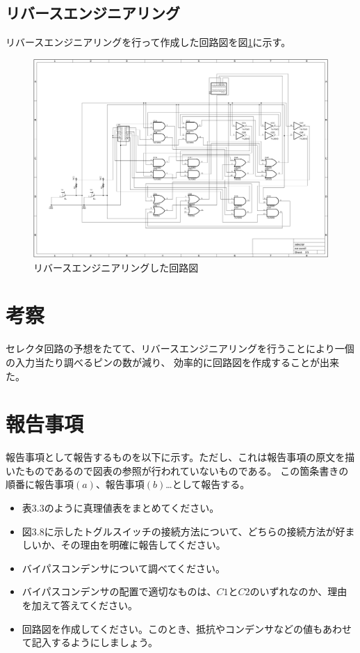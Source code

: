 \documentclass[a4paper,11pt]{ltjsarticle}
\begin{document}
\begin{table}[h]
\begin{tabular}{|c|c|c|c|c|}
\begin{minipage}{0.15\columnwidth}
    \end{minipage} \\
    \hline
  \end{tabular} 
  \label{tab:selector}
\end{table}
\subsection{リバースエンジニアリング}
リバースエンジニアリングを行って作成した回路図を図\ref{fig:reverse}に示す。
\begin{figure}
  \centering
  \includegraphics[angle = 90 , width =0.9\columnwidth]{./image/circuit.png}
  \caption{リバースエンジニアリングした回路図}
  \label{fig:reverse}
\end{figure}
\newpage
\section{考察}
セレクタ回路の予想をたてて、リバースエンジニアリングを行うことにより一個の入力当たり調べるピンの数が減り、
効率的に回路図を作成することが出来た。
\section{報告事項}
報告事項として報告するものを以下に示す。ただし、これは報告事項の原文を描いたものであるので図表の参照が行われていないものである。
この箇条書きの順番に報告事項$(a)$、報告事項$(b)$\dots として報告する。
\begin{itemize}
  \item 表$3.3$のように真理値表をまとめてください。
  \item 図$3.8$に示したトグルスイッチの接続方法について、どちらの接続方法が好ましいか、その理由を明確に報告してください。
  \item バイパスコンデンサについて調べてください。
  \item バイパスコンデンサの配置で適切なものは、$C1$と$C2$のいずれなのか、理由を加えて答えてください。
  \item 回路図を作成してください。このとき、抵抗やコンデンサなどの値もあわせて記入するようにしましょう。
\end{itemize}
\end{document}
